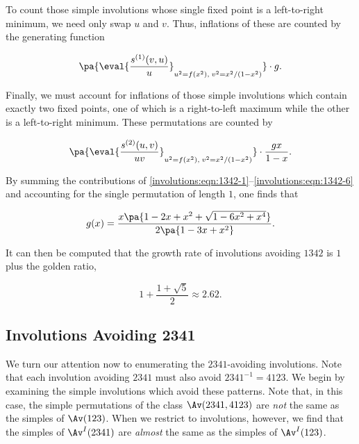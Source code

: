 \documentclass[12pt,twoside]{memoir}
\begin{document}
      To count those simple involutions whose single fixed point is a left-to-right
      minimum, we need only swap $u$ and $v$. Thus, inflations of these are counted
      by the generating function 

      \begin{equation}
        \label{involutions:eqn:1342-5}
        \pa{\eval{\frac{s^{(1)}(v,u)}{u}}_{u^2=f(x^2),\;v^2=x^2/(1-x^2)}}\cdot g.
        \end{equation}

      Finally, we must account for inflations of those simple involutions which
      contain exactly two fixed points, one of which is a right-to-left maximum
      while the other is a left-to-right minimum. These permutations are counted by

      \begin{equation} \label{involutions:eqn:1342-6}
        \pa{\eval{\frac{s^{(2)}(u,v)}{uv}}_{u^2=f(x^2),\;v^2=x^2/(1-x^2)}}\cdot\frac{gx}{1-x}.
      \end{equation}

      By summing the contributions of 
      \eqref{involutions:eqn:1342-1}--\eqref{involutions:eqn:1342-6} 
      and accounting for the single permutation of length $1$, one finds that
      
      $$ g(x) = \frac{x\pa{1-2x+x^2+\sqrt{1-6x^2+x^4}}}{2\pa{1-3x+x^2}}.$$

      It can then be computed that the growth rate of involutions avoiding $1342$
      is $1$ plus the golden ratio, 
      
      $$ 1+\frac{1+\sqrt{5}}{2} \approx 2.62. $$


    \subsection{Involutions Avoiding 2341}
    \label{involutions:sub:2341}

      We turn our attention now to enumerating the $2341$-avoiding involutions.
      Note that each involution avoiding $2341$ must also avoid $2341^{-1} =
      4123$. We begin by examining the simple involutions which avoid these
      patterns. Note that, in this case, the simple permutations of the class
      $\Av(2341, 4123)$ are \emph{not} the same as the simples of $\Av(123)$.
      When we restrict to involutions, however, we find that the simples of
      $\Av^I(2341)$ are \emph{almost} the same as the simples of $\Av^I(123)$. 
\end{document}
